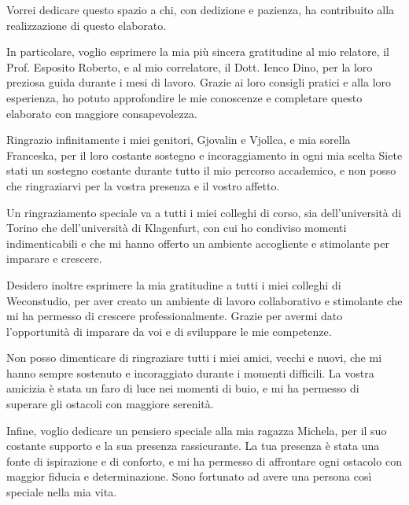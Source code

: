 \thispagestyle{plain}
\vspace*{\fill}
\begin{flushright}
Vorrei dedicare questo spazio a chi, con dedizione e pazienza, ha contribuito alla realizzazione di questo elaborato. 

In particolare, voglio esprimere la mia più sincera gratitudine al mio relatore, il Prof. Esposito Roberto, e al mio correlatore, il Dott. Ienco Dino, per la loro preziosa guida durante i mesi di lavoro.
Grazie ai loro consigli pratici e alla loro esperienza, ho potuto approfondire le mie conoscenze e completare questo elaborato con maggiore consapevolezza.

Ringrazio infinitamente i miei genitori, Gjovalin e Vjollca, e mia sorella Franceska, per il loro costante sostegno e incoraggiamento in ogni mia scelta 
Siete stati un sostegno costante durante tutto il mio percorso accademico, e non posso che ringraziarvi per la vostra presenza e il vostro affetto.

Un ringraziamento speciale va a tutti i miei colleghi di corso, sia dell'università di Torino che dell'università di Klagenfurt, con cui ho condiviso momenti indimenticabili e che mi hanno offerto un ambiente accogliente e stimolante per imparare e crescere.

Desidero inoltre esprimere la mia gratitudine a tutti i miei colleghi di Weconstudio, per aver creato un ambiente di lavoro collaborativo e stimolante che mi ha permesso di crescere professionalmente.
Grazie per avermi dato l'opportunità di imparare da voi e di sviluppare le mie competenze.

Non posso dimenticare di ringraziare tutti i miei amici, vecchi e nuovi, che mi hanno sempre sostenuto e incoraggiato durante i momenti difficili.
La vostra amicizia è stata un faro di luce nei momenti di buio, e mi ha permesso di superare gli ostacoli con maggiore serenità. 

Infine, voglio dedicare un pensiero speciale alla mia ragazza Michela, per il suo costante supporto e la sua presenza rassicurante.
La tua presenza è stata una fonte di ispirazione e di conforto, e mi ha permesso di affrontare ogni ostacolo con maggior fiducia e determinazione.
Sono fortunato ad avere una persona così speciale nella mia vita.

\end{flushright}
\vspace*{\fill}